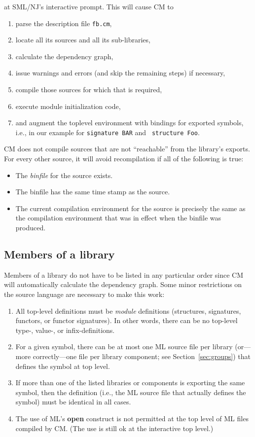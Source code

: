 at SML/NJ's interactive prompt.  This will cause CM to

\begin{enumerate}
\item parse the description file {\tt fb.cm},
\item locate all its sources and all its sub-libraries,
\item calculate the dependency graph,
\item issue warnings and errors (and skip the remaining steps) if
necessary,
\item compile those sources for which that is required,
\item execute module initialization code,
\item and augment the toplevel environment with bindings for exported
symbols, i.e., in our example for {\tt signature BAR} and {\tt
structure Foo}.
\end{enumerate}

CM does not compile sources that are not ``reachable'' from the
library's exports.  For every other source, it will avoid
recompilation if all of the following is true:

\begin{itemize}
\item The {\em binfile} for the source exists.
\item The binfile has the same time stamp as the source.
\item The current compilation environment for the source is precisely
the same as the compilation environment that was in effect when the
binfile was produced.
\end{itemize}

\subsection{Members of a library}

Members of a library do not have to be listed in any particular order
since CM will automatically calculate the dependency graph.  Some
minor restrictions on the source language are necessary to make this
work:
\begin{enumerate}
\item All top-level definitions must be {\em module} definitions
(structures, signatures, functors, or functor signatures).  In other
words, there can be no top-level type-, value-, or infix-definitions.
\item For a given symbol, there can be at most one ML source file per
library (or---more correctly---one file per library component; see
Section~\ref{sec:groups}) that defines the symbol at top level.
\item If more than one of the listed libraries or components is
exporting the same symbol, then the definition (i.e., the ML source
file that actually defines the symbol) must be identical in all cases.
\label{rule:diamond}
\item The use of ML's {\bf open} construct is not permitted at the top
level of ML files compiled by CM.  (The use is still ok at the
interactive top level.)
\end{enumerate}

